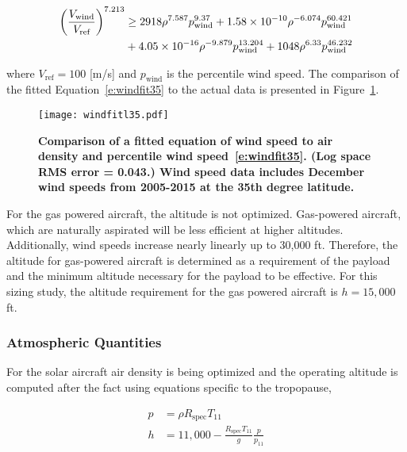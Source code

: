 \documentclass[]{aiaa-tc}%
\begin{document}
\begin{align}
    \left(\frac{V_{\text{wind}}}{V_{\text{ref}}}\right)^{7.213} &\geq 2918\rho^{7.587}p_{\text{wind}}^{9.37} + \num{1.58d-10}\rho^{-6.074}p_{\text{wind}}^{60.421} \nonumber \\
    \label{e:windfit35}
    &+ \num{4.05d-16}\rho^{-9.879}p_{\text{wind}}^{13.204} + 1048\rho^{6.33}p_{\text{wind}}^{46.232}
\end{align}

where $V_{\text{ref}} = 100$ [m/s] and $p_{\text{wind}}$ is the percentile wind speed. The comparison of the fitted Equation~\eqref{e:windfit35} to the actual data is presented in Figure~\ref{f:windfitl35}. 

\begin{figure}[H]
	\begin{center}
	\texttt{[image: windfitl35.pdf]}
    \caption{ \textbf{ Comparison of a fitted equation of wind speed to air density and percentile wind speed~\eqref{e:windfit35}. (Log space RMS error = 0.043.) Wind speed data includes December wind speeds from 2005-2015 at the 35th degree latitude. }}
	\label{f:windfitl35}
	\end{center}
\end{figure}


For the gas powered aircraft, the altitude is not optimized.  
Gas-powered aircraft, which are naturally aspirated will be less efficient at higher altitudes.  
Additionally, wind speeds increase nearly linearly up to 30,000 ft.  
Therefore, the altitude for gas-powered aircraft is determined as a requirement of the payload and the minimum altitude necessary for the payload to be effective.\cite{orion}
For this sizing study, the altitude requirement for the gas powered aircraft is $h=15,000$ ft.

\subsubsection{Atmospheric Quantities}

For the solar aircraft air density is being optimized and the operating altitude is computed after the fact using equations specific to the tropopause,\cite{isaatm} 

\begin{align}
    \label{e:tropopress}
    p &= \rho R_{\text{spec}}T_{11} \\
    \label{e:tropoalt}
    h &= 11,000 - \frac{R_{\text{spec}}T_{11}}{g}\frac{p}{p_{11}} 
\end{align}
\end{document}
